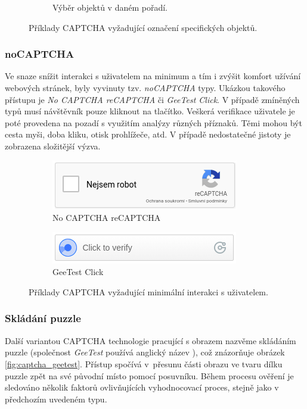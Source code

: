 \documentclass[
  field=ainfp,
  master=true,
  biblatex,
  sourcecodes=false,
  theorems=false,
  glossaries,
  index
]{kidiplom}
\begin{document}
\begin{figure}[H]
\begin{subfigure}[b]{.5\textwidth}
  \caption{Výběr objektů v daném pořadí.}  \label{fig:geetest_selection}
\end{subfigure}
\caption{Příklady CAPTCHA vyžadující označení specifických objektů.}
\label{fig:image_selection}
\end{figure}

\subsubsection*{noCAPTCHA}
Ve snaze snížit interakci s uživatelem na minimum a tím i zvýšit komfort užívání webových stránek, byly vyvinuty tzv. \textit{noCAPTCHA} typy. 
Ukázkou takového přístupu je \textit{No CAPTCHA reCAPTCHA} či \textit{GeeTest Click}. V případě zmíněných typů musí návštěvník pouze kliknout na tlačítko. Veškerá verifikace uživatele je poté provedena na pozadí s využitím analýzy různých příznaků. Těmi mohou být cesta myši, doba kliku, otisk prohlížeče, atd. V případě nedostatečné jistoty je zobrazena složitější výzva.

\begin{figure}[H]
\centering
\begin{subfigure}[b]{.5\textwidth}
  \centering
  \includegraphics[width=.8\linewidth]{images/nocaptcha.png}
  \caption{No CAPTCHA reCAPTCHA}
  \label{fig:sub1}
\end{subfigure}%
\begin{subfigure}[b]{.5\textwidth}
  \centering
  \includegraphics[width=.8\linewidth]{images/geetest_click.png}
  \caption{GeeTest Click}
  \label{fig:sub2}
\end{subfigure}
\caption{Příklady CAPTCHA vyžadující minimální interakci s uživatelem.}
\label{fig:test}
\end{figure}

\subsubsection*{Skládání puzzle}
Další variantou CAPTCHA technologie pracující s obrazem nazvěme skládáním puzzle (společnost \textit{GeeTest} používá anglický název ), což znázorňuje obrá\-zek \ref{fig:captcha_geetest}. Přístup spočívá v~přesunu části obrazu ve tvaru dílku puzzle zpět na své původní místo pomocí posuvníku. Během procesu ověření je sledováno několik faktorů ovlivňujících vyhodnocovací proces, stejně jako v předchozím uvedeném typu.
\end{document}
